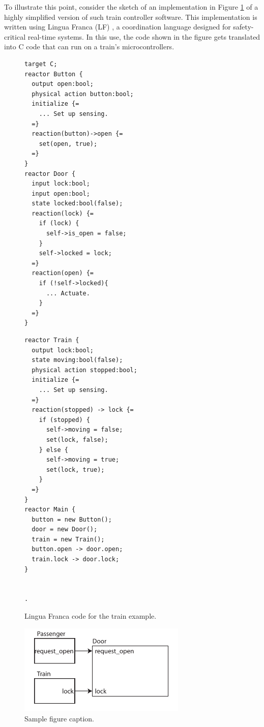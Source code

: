 \documentclass{article}
\begin{document}
To illustrate this point, consider the sketch of an implementation in Figure \ref{fig:lf}
of a highly simplified version of such train controller software.
This implementation is written using Lingua Franca (LF) \cite{FIXME}, a coordination language
designed for safety-critical real-time systems.
In this use, the code shown in the figure gets translated into C code that can run on a train's microcontrollers.

\begin{figure}[bt]
\centering
\begin{minipage}{0.50\linewidth}
\begin{lstlisting}[language=LF]
target C;
reactor Button {
  output open:bool;
  physical action button:bool;
  initialize {=
    ... Set up sensing.
  =}
  reaction(button)->open {=
    set(open, true);
  =}
}
reactor Door {
  input lock:bool;
  input open:bool;
  state locked:bool(false);
  reaction(lock) {=
    if (lock) {
      self->is_open = false;
    }
    self->locked = lock;
  =}
  reaction(open) {=
    if (!self->locked){
      ... Actuate.
    }     
  =}
}
\end{lstlisting}
\end{minipage}%
\begin{minipage}{0.45\linewidth}
\begin{lstlisting}[language=LF,firstnumber=28]
reactor Train {
  output lock:bool;
  state moving:bool(false);
  physical action stopped:bool;
  initialize {=
    ... Set up sensing.
  =}
  reaction(stopped) -> lock {=
    if (stopped) {
      self->moving = false;
      set(lock, false);
    } else {
      self->moving = true;
      set(lock, true);
    }
  =}
}
reactor Main {
  button = new Button();
  door = new Door();
  train = new Train();
  button.open -> door.open;
  train.lock -> door.lock;
}
  
  
.
\end{lstlisting}
\end{minipage}%
\caption{Lingua Franca code for the train example.
\label{fig:lf}}
\end{figure}

\begin{figure}[b]
  \centering
  \includegraphics[width=8cm]{DoorControllerSimple.pdf}
  \caption{Sample figure caption.}
  \label{fig:DoorControllerSimple}
\end{figure}
\end{document}
